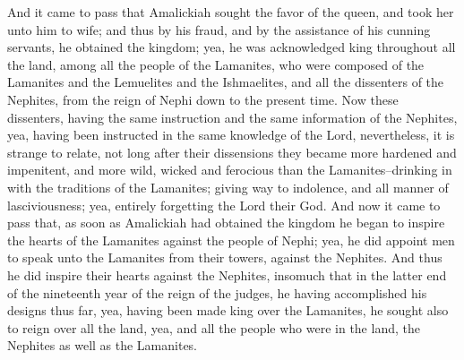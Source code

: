 And it came to pass that Amalickiah sought the favor of the queen, and took her unto him to wife; and thus by his fraud, and by the assistance of his cunning servants, he obtained the kingdom; yea, he was acknowledged king throughout all the land, among all the people of the Lamanites, who were composed of the Lamanites and the Lemuelites and the Ishmaelites, and all the dissenters of the Nephites, from the reign of Nephi down to the present time.
\bverse \iffalse Now these dissenters, having the same instruction and the same information of the Nephites, yea, having been instructed in the same knowledge of the Lord, nevertheless, it is strange to relate, not long after their dissensions they became more hardened and impenitent, and more wild, wicked and ferocious than the Lamanites--drinking in with the traditions of the Lamanites; giving way to indolence, and all manner of lasciviousness; yea, entirely forgetting the Lord their God. \fi
Now these dissenters, having the same instruction and the same information of the Nephites, yea, having been instructed in the same knowledge of the Lord, nevertheless, it is strange to relate, not long after their dissensions they became more hardened and impenitent, and more wild, wicked and ferocious than the Lamanites--drinking in with the traditions of the Lamanites; giving way to indolence, and all manner of lasciviousness; yea, entirely forgetting the Lord their God.
\bchapter
\bverse \iffalse And now it came to pass that, as soon as Amalickiah had obtained the kingdom he began to inspire the hearts of the Lamanites against the people of Nephi; yea, he did appoint men to speak unto the Lamanites from their towers, against the Nephites. \fi
And now it came to pass that, as soon as Amalickiah had obtained the kingdom he began to inspire the hearts of the Lamanites against the people of Nephi; yea, he did appoint men to speak unto the Lamanites from their towers, against the Nephites.
\bverse \iffalse And thus he did inspire their hearts against the Nephites, insomuch that in the latter end of the nineteenth year of the reign of the judges, he having accomplished his designs thus far, yea, having been made king over the Lamanites, he sought also to reign over all the land, yea, and all the people who were in the land, the Nephites as well as the Lamanites. \fi
And thus he did inspire their hearts against the Nephites, insomuch that in the latter end of the nineteenth year of the reign of the judges, he having accomplished his designs thus far, yea, having been made king over the Lamanites, he sought also to reign over all the land, yea, and all the people who were in the land, the Nephites as well as the Lamanites.
